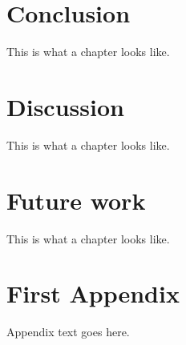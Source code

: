 \documentclass[a4paper,11pt]{kth-mag}
\begin{document}
\chapter{Conclusion}
This is what a chapter looks like.

\chapter{Discussion}
This is what a chapter looks like.

\chapter{Future work}
This is what a chapter looks like.





\appendix
\addappheadtotoc
\chapter{First Appendix}

Appendix text goes here.
\end{document}
